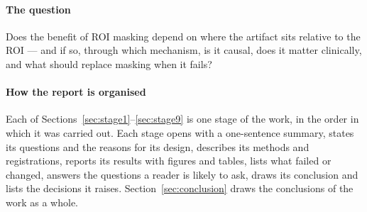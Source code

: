\paragraph{The question} Does the benefit of ROI masking depend on where the artifact sits relative to the ROI --- and
if so, through which mechanism, is it causal, does it matter clinically, and what should replace masking when it fails?
\paragraph{How the report is organised} Each of Sections~\ref{sec:stage1}--\ref{sec:stage9} is one stage of the work, in
the order in which it was carried out. Each stage opens with a one-sentence summary, states its questions and the
reasons for its design, describes its methods and registrations, reports its results with figures and tables, lists
what failed or changed, answers the questions a reader is likely to ask, draws its conclusion and lists the decisions it
raises. Section~\ref{sec:conclusion} draws the conclusions of the work as a whole.
